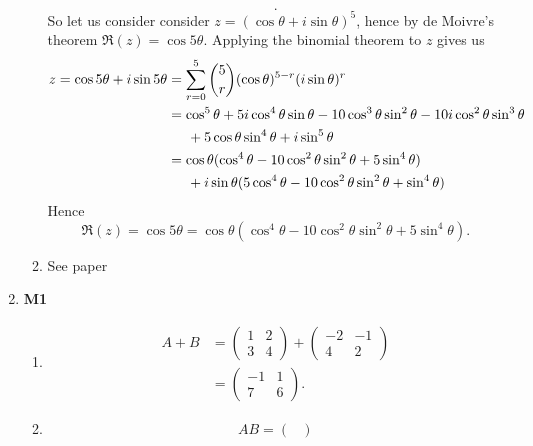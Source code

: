 \documentclass[12pt,oneside]{book}
\begin{document}
\begin{enumerate}
\begin{enumerate}
\[            .\] So let us consider consider $z = (\cos \theta + i \sin \theta)^5$, hence by de Moivre's theorem $\Re(z) = \cos 5 \theta$. Applying the binomial theorem to $z$ gives us \begin{align*}
                z = \cos 5 \theta + i \sin 5 \theta &= \sum_{r = 0}^{5} {5 \choose r} (\cos \theta)^{5 - r} (i\sin\theta)^{r} \\
                &= \cos^5 \theta + 5i \cos^4 \theta \sin \theta - 10\cos^3 \theta \sin^2 \theta - 10i \cos^2 \theta \sin^3 \theta \\
                &\hspace{5mm} + 5\cos \theta \sin^4 \theta + i \sin^5 \theta \\
                &= \cos \theta (\cos^4 \theta - 10 \cos^2 \theta \sin^2 \theta + 5 \sin^4 \theta) \\
                &\hspace{5mm} + i \sin \theta (5\cos^4 \theta - 10 \cos^2 \theta \sin^2 \theta + \sin^4 \theta)
            \end{align*} 
            Hence \[
                \Re(z) = \cos 5\theta = \cos \theta (\cos^4 \theta - 10 \cos^2 \theta \sin^2 \theta + 5 \sin^4 \theta)
            .\] 
            \item See paper 
        \end{enumerate}
        \item \textbf{M1} \begin{enumerate}
            \item \begin{align*}
                A + B &= \begin{pmatrix} 
                    1 & 2 \\
                    3 & 4
                \end{pmatrix} + \begin{pmatrix} 
                    -2 & -1 \\
                    4 & 2
                \end{pmatrix} \\
                &= \begin{pmatrix} 
                    -1 & 1 \\
                    7 & 6
                \end{pmatrix}.
            \end{align*}
            \item \begin{align*}
                AB = \begin{pmatrix} 

\end{pmatrix}
\end{align*}
\end{enumerate}
\end{enumerate}
\end{document}
